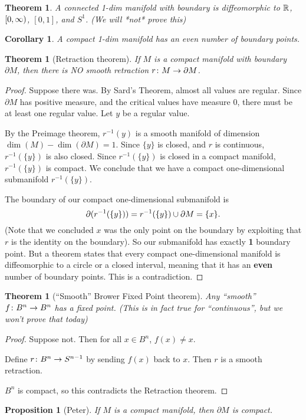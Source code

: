 \documentclass[11pt]{amsbook}
\theoremstyle{mystyle} %
\newtheorem{thrm}[thm]{Theorem}
\newtheorem{coro}[thm]{Corollary}
\newtheorem{propo}[thm]{Proposition}
\numberwithin{thm}{section}
\renewcommand{\d}{\partial}
\begin{document}
\begin{thrm}
	A connected 1-dim manifold with boundary is diffeomorphic to ${\mathbb R}$, $[0,\infty)$, $[0,1]$, and $S^1$.  (We will *not* prove this)
\end{thrm}
\begin{coro}
	A compact 1-dim manifold has an even number of boundary points.
\end{coro}
\begin{thrm}[Retraction theorem]
	If $M$ is a compact manifold with boundary $\d M$, then there is NO smooth retraction $r \from M \to \d M$.
\end{thrm}
\begin{proof}
	Suppose there was.  By Sard's Theorem, almost all values are regular.  Since $\d M$ has positive measure, and the critical values have measure 0, there must be at least one regular value.  Let $y$ be a regular value.

	By the Preimage theorem, $r^{-1}(y)$ is a smooth manifold of dimension $\dim(M) - \dim(\d M) = 1$.  Since $\{y\}$ is closed, and $r$ is continuous, $r^{-1}(\{y\})$ is also closed.  Since $r^{-1}(\{y\})$ is closed in a compact manifold, $r^{-1}(\{y\})$ is compact.  We conclude that we have a compact one-dimensional submanifold $r^{-1}(\{y\})$.

	The boundary of our compact one-dimensional submanifold is $$\d (r ^{-1}(\{y\})) = r^{-1}(\{y\}) \union \d M = \{x\}.$$  (Note that we concluded $x$ was the only point on the boundary by exploiting that $r$ is the identity on the boundary).   So our submanifold has exactly \textbf{1} boundary point.  But a theorem states that every compact one-dimensional manifold is diffeomorphic to a circle or a closed interval, meaning that it has an \textbf{even} number of boundary points.  This is a contradiction.
\end{proof}
\begin{thrm}[``Smooth'' Brower Fixed Point theorem]
	Any ``smooth'' $f \colon B^n \to B^n$ has a fixed point.  (This is in fact true for ``continuous'', but we won't prove that today)
\end{thrm}
\begin{proof}
	Suppose not.  Then for all $x \in B^n$, $f(x) \not= x$.

	Define $r \colon B^n \to S^{n-1}$ by sending $f(x)$ back to $x$.  Then $r$ is a smooth retraction.

	$B^n$ is compact, so this contradicts the Retraction theorem.
\end{proof}
\begin{propo}[Peter]
	If $M$ is a compact manifold, then $\d M$ is compact.
\end{propo}
\end{document}
